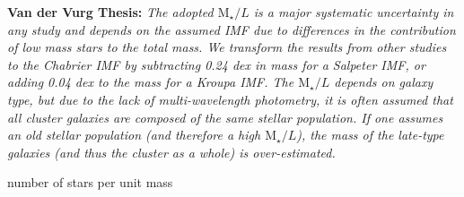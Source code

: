 \textbf{Van der Vurg Thesis:} \textit{The adopted $\text{M}_{\star}/L$ is a major systematic uncertainty in any study and depends on the assumed IMF due to differences in the contribution of low mass stars to the total mass. We transform the results from other studies to the Chabrier IMF by subtracting 0.24 dex in mass for a Salpeter IMF, or adding 0.04 dex to the mass for a Kroupa IMF. The $\text{M}_{\star}/L$ depends on galaxy type, but due to the lack of multi-wavelength photometry, it is often assumed that all cluster galaxies are composed of the same stellar population. If one assumes an old stellar population (and therefore a high $\text{M}_{\star}/L$), the mass of the late-type galaxies (and thus the cluster as a whole) is over-estimated.} \citeyear{Reference2}

number of stars per unit mass


